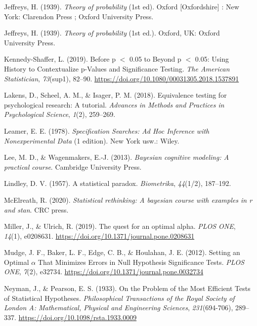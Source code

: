 \documentclass[
  english,
  ,jou,floatsintext]{apa6}
\newlength{\cslhangindent}
\newenvironment{cslreferences}%
  {\setlength{\parindent}{0pt}%
  \everypar{\setlength{\hangindent}{\cslhangindent}}\ignorespaces}%
  {\par}
\begin{document}
\begin{cslreferences}
\leavevmode\hypertarget{ref-jeffreys_theory_1939}{}%
Jeffreys, H. (1939). \emph{Theory of probability} (1st ed). Oxford {[}Oxfordshire{]} : New York: Clarendon Press ; Oxford University Press.

\leavevmode\hypertarget{ref-Jeffreys1939}{}%
Jeffreys, H. (1939). \emph{Theory of probability} (1st ed.). Oxford, UK: Oxford University Press.

\leavevmode\hypertarget{ref-kennedy-shaffer_before_2019}{}%
Kennedy-Shaffer, L. (2019). Before p \(<\) 0.05 to Beyond p \(<\) 0.05: Using History to Contextualize p-Values and Significance Testing. \emph{The American Statistician}, \emph{73}(sup1), 82--90. \url{https://doi.org/10.1080/00031305.2018.1537891}

\leavevmode\hypertarget{ref-lakens2018equivalence}{}%
Lakens, D., Scheel, A. M., \& Isager, P. M. (2018). Equivalence testing for psychological research: A tutorial. \emph{Advances in Methods and Practices in Psychological Science}, \emph{1}(2), 259--269.

\leavevmode\hypertarget{ref-leamer_specification_1978}{}%
Leamer, E. E. (1978). \emph{Specification Searches: Ad Hoc Inference with Nonexperimental Data} (1 edition). New York usw.: Wiley.

\leavevmode\hypertarget{ref-LeeWagenmakersBayesBook}{}%
Lee, M. D., \& Wagenmakers, E.-J. (2013). \emph{Bayesian cognitive modeling: A practical course}. Cambridge University Press.

\leavevmode\hypertarget{ref-lindley_statistical_1957}{}%
Lindley, D. V. (1957). A statistical paradox. \emph{Biometrika}, \emph{44}(1/2), 187--192.

\leavevmode\hypertarget{ref-mcelreath2020statistical}{}%
McElreath, R. (2020). \emph{Statistical rethinking: A bayesian course with examples in r and stan}. CRC press.

\leavevmode\hypertarget{ref-miller_quest_2019}{}%
Miller, J., \& Ulrich, R. (2019). The quest for an optimal alpha. \emph{PLOS ONE}, \emph{14}(1), e0208631. \url{https://doi.org/10.1371/journal.pone.0208631}

\leavevmode\hypertarget{ref-mudge_setting_2012}{}%
Mudge, J. F., Baker, L. F., Edge, C. B., \& Houlahan, J. E. (2012). Setting an Optimal \(\alpha\) That Minimizes Errors in Null Hypothesis Significance Tests. \emph{PLOS ONE}, \emph{7}(2), e32734. \url{https://doi.org/10.1371/journal.pone.0032734}

\leavevmode\hypertarget{ref-neyman_problem_1933}{}%
Neyman, J., \& Pearson, E. S. (1933). On the Problem of the Most Efficient Tests of Statistical Hypotheses. \emph{Philosophical Transactions of the Royal Society of London A: Mathematical, Physical and Engineering Sciences}, \emph{231}(694-706), 289--337. \url{https://doi.org/10.1098/rsta.1933.0009}


\end{cslreferences}
\end{document}
